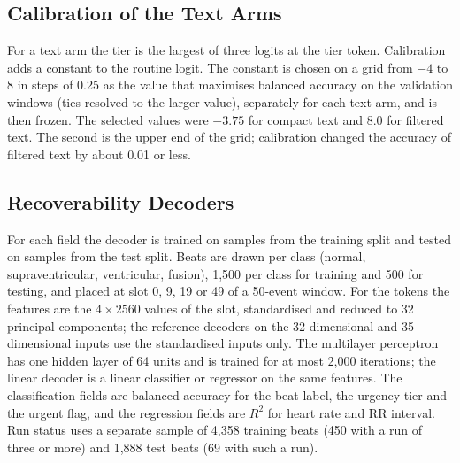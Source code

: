 \subsection{Calibration of the Text Arms}
For a text arm the tier is the largest of three logits at the tier token. Calibration adds a constant to the routine logit. The constant is chosen on a grid from $-4$ to $8$ in steps of 0.25 as the value that maximises balanced accuracy on the validation windows (ties resolved to the larger value), separately for each text arm, and is then frozen. The selected values were $-3.75$ for compact text and $8.0$ for filtered text. The second is the upper end of the grid; calibration changed the accuracy of filtered text by about 0.01 or less.

\subsection{Recoverability Decoders}
For each field the decoder is trained on samples from the training split and tested on samples from the test split. Beats are drawn per class (normal, supraventricular, ventricular, fusion), 1,500 per class for training and 500 for testing, and placed at slot 0, 9, 19 or 49 of a 50-event window. For the tokens the features are the $4\times2560$ values of the slot, standardised and reduced to 32 principal components; the reference decoders on the 32-dimensional and 35-dimensional inputs use the standardised inputs only. The multilayer perceptron has one hidden layer of 64 units and is trained for at most 2,000 iterations; the linear decoder is a linear classifier or regressor on the same features. The classification fields are balanced accuracy for the beat label, the urgency tier and the urgent flag, and the regression fields are $R^2$ for heart rate and RR interval. Run status uses a separate sample of 4,358 training beats (450 with a run of three or more) and 1,888 test beats (69 with such a run).
